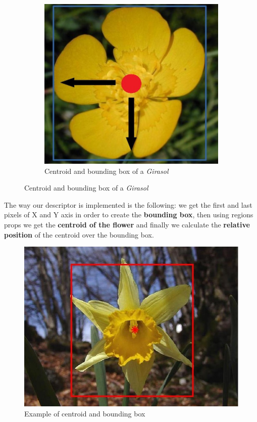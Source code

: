 \documentclass[11]{article}
\begin{document}
\begin{figure}[H]
    \begin{subfigure}[t]{0.45\textwidth}
    \centering
    \includegraphics[scale=0.2]{images/GirasolCentroid.jpg}
    \caption{Centroid and bounding box of a \textit{Girasol}}
    \label{centroidgirasol}
    \end{subfigure}
\end{figure}

The way our descriptor is implemented is the following: we get the first and last pixels of X and Y axis in order to create the \textbf{bounding box}, then using regions props we get the \textbf{centroid of the flower} and finally we calculate the \textbf{relative position} of the centroid over the bounding box. 
\medskip

\begin{figure}[H]
	\centering
	\includegraphics[scale=0.35]{images/centroid.jpg}
	\caption{Example of centroid and bounding box}
	\label{centroidNarcis}
\end{figure}
\end{document}
